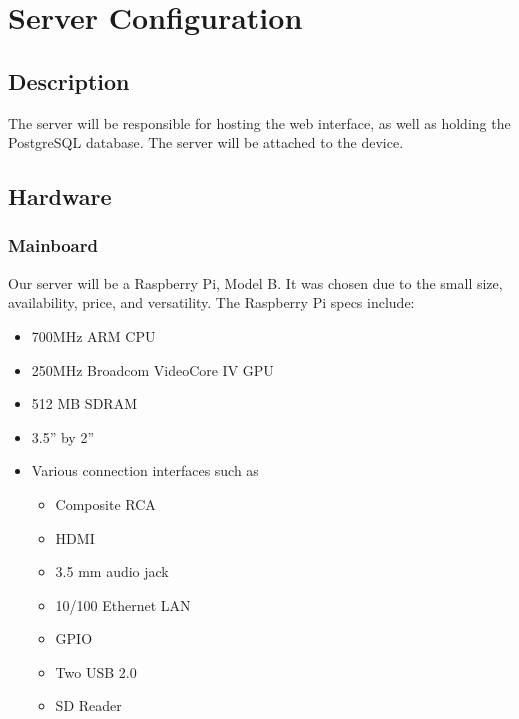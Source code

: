 \chapter{Server Configuration}
{
    \renewcommand*{\theenumi}{\thesubsection.\arabic{enumi}}
    \renewcommand*{\theenumii}{\theenumi.\arabic{enumii}}
    \renewcommand*{\theenumiii}{\theenumii.\arabic{enumiii}}

    \section{Description}
        The server will be responsible for hosting the web interface, as 
        well as holding the PostgreSQL database. The server will be attached 
        to the device.

    \section{Hardware}

        \subsection{Mainboard}
            Our server will be a Raspberry Pi, Model B. It was chosen due to the 
            small size, availability, price, and versatility. The Raspberry Pi 
            specs include:
            \begin{itemize}
                \item 700MHz ARM CPU
                \item 250MHz Broadcom VideoCore IV GPU
                \item 512 MB SDRAM
                \item 3.5” by 2”
                \item Various connection interfaces such as
                \begin{itemize}
                    \item Composite RCA
                    \item HDMI
                    \item 3.5 mm audio jack
                    \item 10/100 Ethernet LAN
                    \item GPIO
                    \item Two USB 2.0
                    \item SD Reader
                \end{itemize}
            \end{itemize}

}
